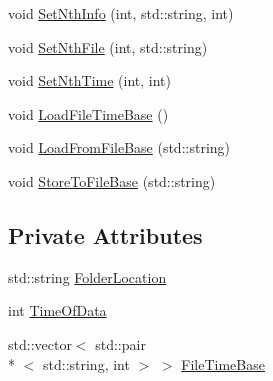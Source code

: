 \begin{DoxyCompactItemize}
void \hyperlink{classFileHistory_a433153884b5c84c40cf09e9dc0783a7d}{Set\-Nth\-Info} (int, std\-::string, int)
\item 
void \hyperlink{classFileHistory_a231ec4de86666d32c332ccd8b129007d}{Set\-Nth\-File} (int, std\-::string)
\item 
void \hyperlink{classFileHistory_a34e0887629722064f1e077cf7ceff7aa}{Set\-Nth\-Time} (int, int)
\item 
void \hyperlink{classFileHistory_a352c832218a7912402142e80a6563233}{Load\-File\-Time\-Base} ()
\item 
void \hyperlink{classFileHistory_a0e797c6bfddd9a9ac2ef73ca2ccf5ea3}{Load\-From\-File\-Base} (std\-::string)
\item 
void \hyperlink{classFileHistory_aa51ad2b7dfd56927ae83f8abbd2fdbc1}{Store\-To\-File\-Base} (std\-::string)
\end{DoxyCompactItemize}
\subsection*{Private Attributes}
\begin{DoxyCompactItemize}
\item 
std\-::string \hyperlink{classFileHistory_a4ed9b51579a45e657ba6e1dbb4d2e7a7}{Folder\-Location}
\item 
int \hyperlink{classFileHistory_ac054d9b23889c2d64faebfbb67bcf444}{Time\-Of\-Data}
\item 
std\-::vector$<$ std\-::pair\\*
$<$ std\-::string, int $>$ $>$ \hyperlink{classFileHistory_ac4ce01b2c30fedd241d93107f34c3750}{File\-Time\-Base}
\end{DoxyCompactItemize}


